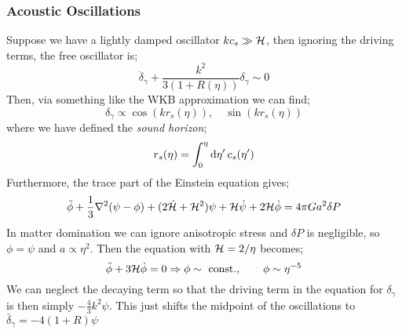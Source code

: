 \subsubsection*{Acoustic Oscillations}
Suppose we have a lightly damped oscillator $k c_s \gg \mathcal{H}$, then ignoring the driving terms, the free oscillator is;
\begin{equation*}
\ddot{\delta}_\gamma + \frac{k^2}{3\left(1 + R(\eta)\right)}\delta_{\gamma} \sim 0
\end{equation*}
Then, via something like the WKB approximation we can find;
\begin{equation}
\delta_\gamma \propto \cos\left(k r_s(\eta)\right), \quad \sin\left(k r_s(\eta)\right)
\end{equation}
where we have defined the \emph{sound horizon};
\begin{equation}
r_s(\eta) = \int_0^{\eta}{\text{d}\eta^{\prime} \,c_s(\eta^{\prime})}
\end{equation}
Furthermore, the trace part of the Einstein equation gives;
\begin{equation}
\ddot{\phi} + \frac{1}{3}\nabla^2 (\psi - \phi) + (2 \dot{\mathcal{H}} + \mathcal{H}^2)\psi + \mathcal{H} \dot{\psi} + 2\mathcal{H} \dot{\phi} = 4\pi Ga^2 \delta P
\end{equation}
In matter domination we can ignore anisotropic stress and $\delta P$ is negligible, so $\phi = \psi$ and $a \propto \eta^2$. Then the equation with $\mathcal{H} = 2/\eta$ becomes;
\begin{equation*}
\ddot{\phi} + 3\mathcal{H} \dot{\phi} = 0 \Rightarrow \phi \sim \,\,\text{const.}, \qquad \phi\sim \eta^{-5}
\end{equation*}
We can neglect the decaying term so that the driving term in the equation for $\delta_\gamma$ is then simply $-\tfrac{4}{3}k^2 \psi$. This just shifts the midpoint of the oscillations to $\bar{\delta}_\gamma = -4(1 + R)\psi$
